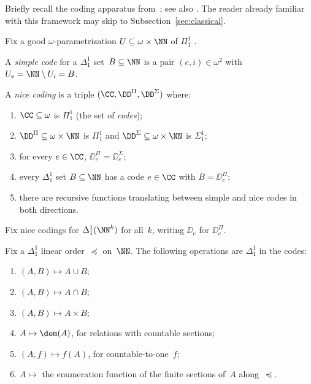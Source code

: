 Briefly recall the coding apparatus from~\cite[Appendix~A]{thornton-thesis}; see also \cite[Section~4]{thornton2022algebraic}.
The reader already familiar with this framework may skip to Subsection~\ref{sec:classical}.

Fix a good $\omega$-parametrization $U\subseteq\omega\times\NN$ of $\Pi^1_1$ \cite[Theorem~A.5]{thornton2022algebraic}.

\begin{definition}\label{def:simple-nice-codes}
	A \emph{simple code} for a $\Delta^1_1$ set~$B\subseteq\NN$ is a pair $(e,i)\in\omega^2$ with $U_e = \NN\setminus U_i = B$.

	A \emph{nice coding} is a triple $(\CC,\DD^\Pi,\DD^\Sigma)$ where:
	\begin{enumerate}[label=(\roman*)]
		\item $\CC\subseteq\omega$ is $\Pi^1_1$ (the set of \emph{codes});
		\item $\DD^\Pi\subseteq\omega\times\NN$ is $\Pi^1_1$ and $\DD^\Sigma\subseteq\omega\times\NN$ is $\Sigma^1_1$;
		\item for every $e\in\CC$, $\DD^\Pi_e = \DD^\Sigma_e$;
		\item every $\Delta^1_1$ set $B\subseteq\NN$ has a code $e\in\CC$ with $B = \DD^\Pi_e$;
		\item there are recursive functions translating between simple and nice codes in both directions.
	\end{enumerate}
\end{definition}

Fix nice codings for $\Delta^1_1(\NN^k)$ for all~$k$, writing $\DD_e$ for $\DD^\Pi_e$.

\begin{lemma}\label{lemma:toolkit}
	Fix a $\Delta^1_1$ linear order~$\preceq$ on~$\NN$.
	The following operations are $\Delta^1_1$ in the codes:
	\begin{enumerate}[label=(\arabic*)]
		\item $(A,B)\mapsto A\cup B$;
		\item $(A,B)\mapsto A\cap B$;
		\item $(A,B)\mapsto A\times B$;
		\item $A\mapsto\dom(A)$, for relations with countable sections;
		\item $(A,f)\mapsto f(A)$, for countable-to-one~$f$;
		\item $A\mapsto$ the enumeration function of the finite sections of~$A$ along~$\preceq$.
	\end{enumerate}
\end{lemma}

